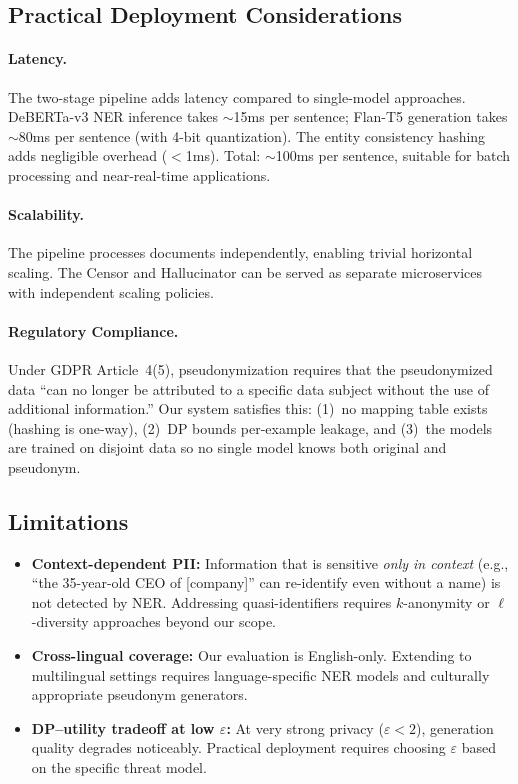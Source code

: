 \documentclass[11pt, a4paper]{article}
\begin{document}
\subsection{Practical Deployment Considerations}

\paragraph{Latency.}
The two-stage pipeline adds latency compared to single-model approaches.
DeBERTa-v3 NER inference takes $\sim$15ms per sentence; Flan-T5
generation takes $\sim$80ms per sentence (with 4-bit quantization).
The entity consistency hashing adds negligible overhead ($<$1ms).
Total: $\sim$100ms per sentence, suitable for batch processing
and near-real-time applications.

\paragraph{Scalability.}
The pipeline processes documents independently, enabling trivial
horizontal scaling.  The Censor and Hallucinator can be served as
separate microservices with independent scaling policies.

\paragraph{Regulatory Compliance.}
Under GDPR Article~4(5), pseudonymization requires that the pseudonymized
data ``can no longer be attributed to a specific data subject without
the use of additional information.''  Our system satisfies this:
(1)~no mapping table exists (hashing is one-way), (2)~DP bounds
per-example leakage, and (3)~the models are trained on disjoint data
so no single model knows both original and pseudonym.

\subsection{Limitations}

\begin{itemize}[leftmargin=*]
  \item \textbf{Context-dependent PII:} Information that is sensitive
        \emph{only in context} (e.g., ``the 35-year-old CEO of
        [company]'' can re-identify even without a name) is not
        detected by NER.  Addressing quasi-identifiers requires
        $k$-anonymity or $\ell$-diversity approaches beyond our scope.
  \item \textbf{Cross-lingual coverage:} Our evaluation is English-only.
        Extending to multilingual settings requires language-specific
        NER models and culturally appropriate pseudonym generators.
  \item \textbf{DP--utility tradeoff at low $\varepsilon$:} At very
        strong privacy ($\varepsilon < 2$), generation quality degrades
        noticeably.  Practical deployment requires choosing $\varepsilon$
        based on the specific threat model.
\end{itemize}
\end{document}
